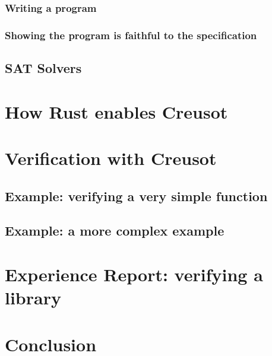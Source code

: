 \documentclass[12pt]{article}
\begin{document}
\subsubsection{Writing a program}

\subsubsection{Showing the program is faithful to the specification}

\subsection{SAT Solvers}


\section{How Rust enables Creusot}



\section{Verification with Creusot}

\subsection{Example: verifying a very simple function}

\subsection{Example: a more complex example}

\section{Experience Report: verifying a library} %

\section{Conclusion}

\end{document}
